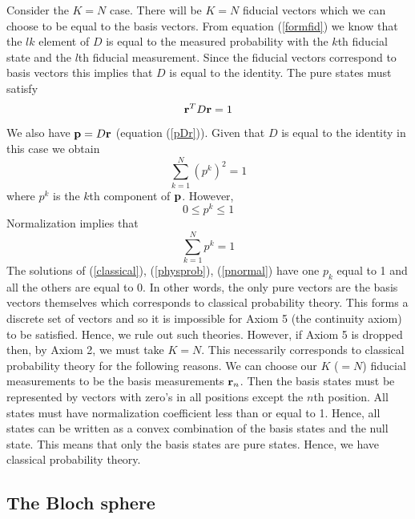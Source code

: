 \documentclass[10pt,twocolumn]{article}
\begin{document}
Consider the $K=N$ case.  There will be $K=N$ fiducial vectors
which we can choose to be equal to the basis vectors.  From equation
(\ref{formfid}) we know that the $lk$ element of
$D$ is equal to the measured probability with the $k$th fiducial state
and the $l$th fiducial measurement.  Since the fiducial vectors
correspond to basis vectors this implies that $D$ is equal to the
identity.  The pure states must
satisfy
\begin{equation}
{\bf r}^T D {\bf r} = 1
\end{equation}
We also have ${\bf p}=D{\bf r}$ (equation (\ref{pDr})).  Given that $D$
is equal to the identity in this case we obtain
\begin{equation}\label{classical}
\sum_{k=1}^N (p^k)^2=1
\end{equation}
where ${p^k}$ is the $k$th component of ${\bf p}$.  However,
\begin{equation}\label{physprob}
0\leq p^k \leq 1
\end{equation}
Normalization implies that
\begin{equation}\label{pnormal}
\sum_{k=1}^N p^k=1
\end{equation}
The solutions of (\ref{classical}), (\ref{physprob}),
(\ref{pnormal}) have one
$p_k$ equal to 1 and all the others are equal to 0.  In other words,
the only pure vectors are the basis vectors themselves which corresponds
to classical probability theory. This forms
a discrete set of vectors and so it is impossible for Axiom 5 (the continuity
axiom) to be satisfied.  Hence, we rule out such theories.  However, if
Axiom 5 is dropped then, by Axiom 2, we must take $K=N$.  This
necessarily corresponds to classical probability theory for the
following reasons.  We can choose our $K$ ($=N$) fiducial measurements
to be the basis measurements ${\bf r}_n$.  Then the basis states must be
represented by vectors with zero's in all positions except the $n$th
position.  All states must have normalization coefficient less than or
equal to 1.  Hence, all states can be written as a convex combination of
the basis states and the null state.  This means that only the basis
states are pure states.  Hence, we have classical probability theory.



\subsection{The Bloch sphere}\label{secbloch}
\end{document}
